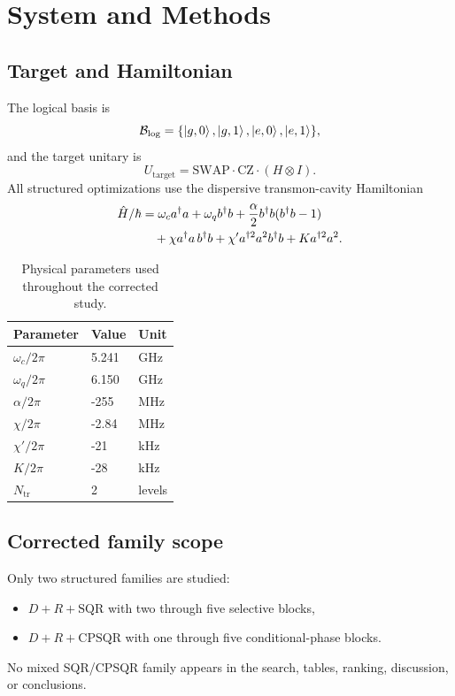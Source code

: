 ﻿\documentclass[aps,pra,twocolumn,reprint,amsmath,amssymb,floatfix]{revtex4-2}
\begin{document}
\section{System and Methods}

\subsection{Target and Hamiltonian}

The logical basis is
\begin{equation}
\mathcal{B}_{\mathrm{log}} =
\{\ket{g,0},\ket{g,1},\ket{e,0},\ket{e,1}\},
\end{equation}
and the target unitary is
\begin{equation}
U_{\mathrm{target}} = \mathrm{SWAP}\cdot\mathrm{CZ}\cdot(H\otimes I).
\end{equation}
All structured optimizations use the dispersive transmon-cavity Hamiltonian
\cite{blais2021circuit}
\begin{align}
\hat{H}/\hbar &= \omega_c a^\dagger a + \omega_q b^\dagger b
+ \frac{\alpha}{2}b^\dagger b(b^\dagger b-1) \notag \\
&\quad + \chi a^\dagger a\,b^\dagger b
+ \chi' a^{\dagger 2} a^2 b^\dagger b + K a^{\dagger 2} a^2.
\end{align}

\begin{table}[htbp]
\centering
\caption{Physical parameters used throughout the corrected study.}
\label{tab:params}
\begin{tabular}{@{}lll@{}}
\toprule
Parameter & Value & Unit \\
\midrule
$\omega_c/2\pi$ & 5.241 & GHz \\
$\omega_q/2\pi$ & 6.150 & GHz \\
$\alpha/2\pi$   & -255 & MHz \\
$\chi/2\pi$     & -2.84 & MHz \\
$\chi'/2\pi$    & -21 & kHz \\
$K/2\pi$        & -28 & kHz \\
$N_{\mathrm{tr}}$ & 2 & levels \\
\bottomrule
\end{tabular}
\end{table}

\subsection{Corrected family scope}

Only two structured families are studied:
\begin{itemize}
  \item $D+R+\mathrm{SQR}$ with two through five selective blocks,
  \item $D+R+\mathrm{CPSQR}$ with one through five conditional-phase blocks.
\end{itemize}
No mixed SQR/CPSQR family appears in the search, tables, ranking, discussion,
or conclusions.
\end{document}
